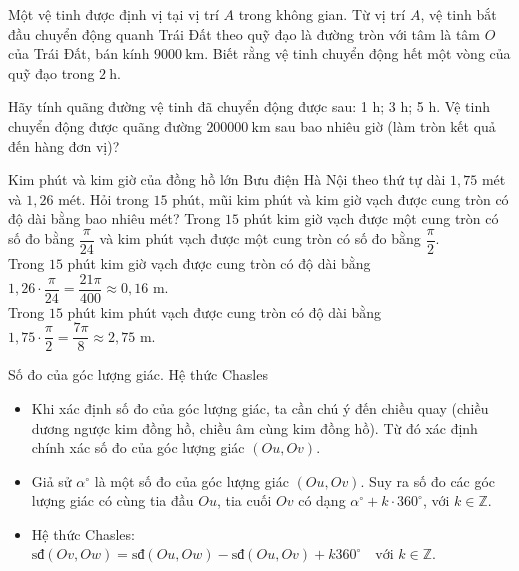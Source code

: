 \begin{vd}
	Một vệ tinh được định vị tại vị trí $A$ trong không gian. Từ vị trí $A$, vệ tinh bắt đầu chuyển động quanh Trái Đất theo quỹ đạo là đường tròn với tâm là tâm $O$ của Trái Đất, bán kính $9000 \mathrm{~km}$. Biết rằng vệ tinh chuyển động hết một vòng của quỹ đạo trong $2 \mathrm{~h}$.
	\begin{tasks}
		\task Hãy tính quãng đường vệ tinh đã chuyển động được sau: 1 h; 3 h; 5 h.
		\task Vệ tinh chuyển động được quãng đường $200000 \mathrm{~km}$ sau bao nhiêu giờ (làm tròn kết quả đến hàng đơn vị)?
	\end{tasks}
\end{vd}
\begin{vd}%
	Kim phút và kim giờ của đồng hồ lớn Bưu điện Hà Nội theo thứ tự dài $1{,}75$ mét và $1{,}26$ mét. Hỏi trong $15$ phút, mũi kim phút và kim giờ vạch được cung tròn có độ dài bằng bao nhiêu mét?
	\loigiai
	{
		Trong $15$ phút kim giờ vạch được một cung tròn có số đo bằng $\dfrac{\pi}{24}$ và kim phút vạch được một cung tròn có số đo bằng $\dfrac{\pi}{2}$.\\
		Trong $15$ phút kim giờ vạch được cung tròn có độ dài bằng $1{,}26\cdot \dfrac{\pi}{24} = \dfrac{21\pi}{400} \approx 0{,}16$ m.\\
		Trong $15$ phút kim phút vạch được cung tròn có độ dài bằng $1{,}75 \cdot \dfrac{\pi}{2} = \dfrac{7\pi}{8} \approx 2{,}75$ m.
	}
\end{vd}
\begin{dang}{Số đo của góc lượng giác. Hệ thức Chasles}
	\begin{itemize}
		\item  Khi xác định số đo của góc lượng giác, ta cần chú ý đến chiều quay (chiều dương ngược kim đồng hồ, chiều âm cùng kim đồng hồ). Từ đó xác định chính xác số đo của góc lượng giác $(Ou,Ov)$.
		\item  Giả sử $\alpha^\circ$ là một số đo của góc lượng giác $(Ou,Ov)$. Suy ra số đo các góc lượng giác có cùng tia đầu $Ou$, tia cuối $Ov$ có dạng $\alpha^\circ+k\cdot 360^\circ$, với $k \in 
		\mathbb{Z}$.
		\item  Hệ thức Chasles: $\text{sđ}(Ov,Ow)=\text{sđ}(Ou,Ow)-\text{sđ}(Ou, Ov)+k360^{\circ} \quad \text{với } k \in \mathbb{Z}.$
	\end{itemize}
	
\end{dang}

